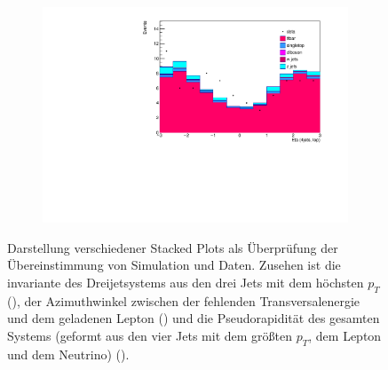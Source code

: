 \begin{figure}[H]
\begin{subfigure}{0.5\textwidth}
    \includegraphics[width=\linewidth]{plots_and_txt/stacked_plots/stacked_fulleta.pdf}
    \caption{}
    \label{fig:stacked_fulleta}
  \end{subfigure}%
  \caption{Darstellung verschiedener Stacked Plots als Überprüfung der Übereinstimmung von Simulation und Daten.
  Zusehen ist die invariante des Dreijetsystems aus den drei Jets mit dem höchsten $p_T$ (),  
  der Azimuthwinkel zwischen der fehlenden Transversalenergie und dem geladenen 
  Lepton () und die Pseudorapidität des gesamten Systems (geformt aus den vier Jets mit dem größten $p_T$, dem Lepton und dem 
  Neutrino) ().
  }
  \label{fig:stacked_Distributions4}
\end{figure}












